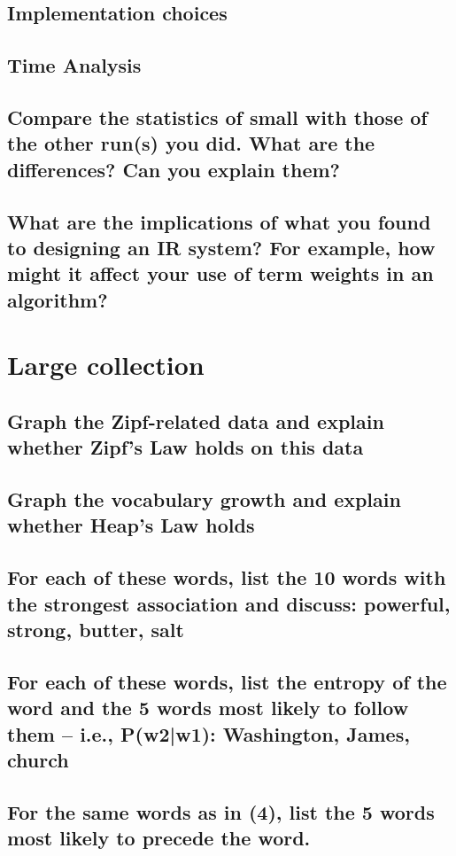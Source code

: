 \documentclass[12pt,letterpaper]{article}
\begin{document}
\subsection*{Implementation choices}
\subsection*{Time Analysis}
\subsection*{Compare the statistics of small with those of the other run(s) you did. What are the differences?  Can you explain them?}
\subsection*{What are the implications of what you found to designing an IR system?  For example, how might it affect your use of term weights in an algorithm?}

\section*{Large collection}

\subsection*{Graph the Zipf-related data and explain whether Zipf's Law holds on this data}
\subsection*{Graph the vocabulary growth and explain whether Heap's Law holds}
\subsection*{For each of these words, list the 10 words with the strongest association and discuss: powerful, strong, butter, salt}
\subsection*{For each of these words, list the entropy of the word and the 5 words most likely to follow them -- i.e., P(w2|w1): Washington, James, church}
\subsection*{For the same words as in (4), list the 5 words most likely to precede the word.}
\end{document}
